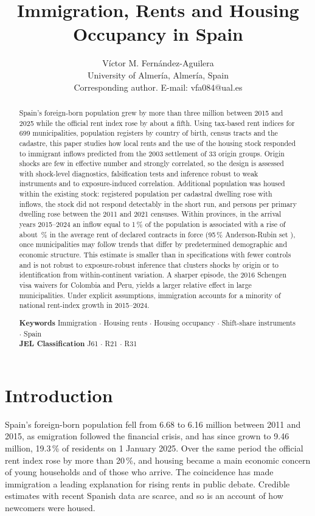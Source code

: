 \documentclass[11pt,a4paper]{article}
\title{\bfseries Immigration, Rents and Housing Occupancy in Spain}
\author{Víctor M. Fernández-Aguilera\\[4pt]
{\small University of Almería, Almería, Spain}\\
{\small Corresponding author. E-mail: vfa084@ual.es}}
\date{}
\begin{document}
\maketitle

\begin{abstract}\noindent
Spain's foreign-born population grew by more than three million between 2015 and 2025 while the official rent index rose by about a fifth. Using tax-based rent indices for 699 municipalities, population registers by country of birth, census tracts and the cadastre, this paper studies how local rents and the use of the housing stock responded to immigrant inflows predicted from the 2003 settlement of 33 origin groups. Origin shocks are few in effective number and strongly correlated, so the design is assessed with shock-level diagnostics, falsification tests and inference robust to weak instruments and to exposure-induced correlation. Additional population was housed within the existing stock: registered population per cadastral dwelling rose with inflows, the stock did not respond detectably in the short run, and persons per primary dwelling rose between the 2011 and 2021 censuses. Within provinces, in the arrival years 2015--2024 an inflow equal to 1\,\% of the population is associated with a rise of about \cenArrB\,\% in the average rent of declared contracts in force (95\,\% Anderson-Rubin set \cenArrAR), once municipalities may follow trends that differ by predetermined demographic and economic structure. This estimate is smaller than in specifications with fewer controls and is not robust to exposure-robust inference that clusters shocks by origin or to identification from within-continent variation. A sharper episode, the 2016 Schengen visa waivers for Colombia and Peru, yields a larger relative effect in large municipalities. Under explicit assumptions, immigration accounts for a minority of national rent-index growth in 2015--2024.

\medskip\noindent\textbf{Keywords} Immigration $\cdot$ Housing rents $\cdot$ Housing occupancy $\cdot$ Shift-share instruments $\cdot$ Spain\\
\textbf{JEL Classification} J61 $\cdot$ R21 $\cdot$ R31
\end{abstract}
\clearpage
\linenumbers

\section{Introduction}\label{sec:intro}

Spain's foreign-born population fell from 6.68 to 6.16 million between 2011 and 2015, as emigration followed the financial crisis, and has since grown to 9.46 million, 19.3\,\% of residents on 1 January 2025. Over the same period the official rent index rose by more than 20\,\%, and housing became a main economic concern of young households and of those who arrive. The coincidence has made immigration a leading explanation for rising rents in public debate. Credible estimates with recent Spanish data are scarce, and so is an account of how newcomers were housed.
\end{document}
